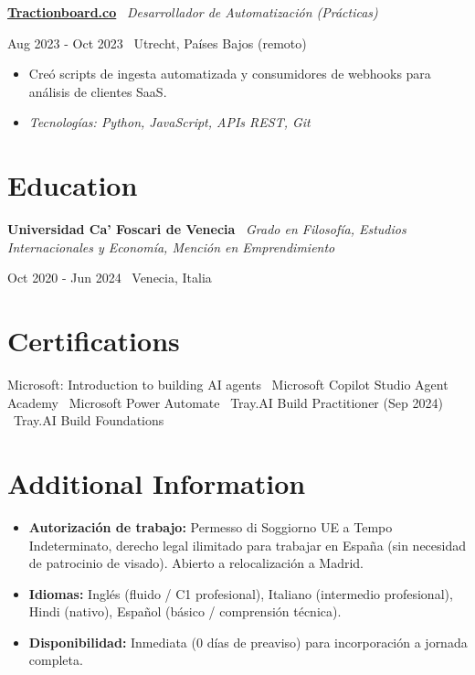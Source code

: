 \documentclass[a4paper,10pt]{article}
\newcommand{\role}[4]{%
  \vspace{2pt}\noindent
  \begin{minipage}[t]{0.70\textwidth}\raggedright\textbf{#1} \textbullet\ \textit{#3}\end{minipage}%
  \hfill
  \begin{minipage}[t]{0.28\textwidth}\raggedleft\footnotesize\color{gray}#2 \textbullet\ #4\end{minipage}%
  \vspace{1pt}%
}
\begin{document}
\role{\href{https://tractionboard.co}{Tractionboard.co}}{Aug 2023 - Oct 2023}{Desarrollador de Automatización (Prácticas)}{Utrecht, Países Bajos (remoto)}
\begin{itemize}
  \item Creó scripts de ingesta automatizada y consumidores de webhooks para análisis de clientes SaaS.
  \item \textit{Tecnologías: Python, JavaScript, APIs REST, Git}
\end{itemize}

\section{Education}
\role{Universidad Ca' Foscari de Venecia}{Oct 2020 - Jun 2024}{Grado en Filosofía, Estudios Internacionales y Economía, Mención en Emprendimiento}{Venecia, Italia}

\section{Certifications}
Microsoft: Introduction to building AI agents \textbullet\ Microsoft Copilot Studio Agent Academy \textbullet\ Microsoft Power Automate \textbullet\ Tray.AI Build Practitioner (Sep 2024) \textbullet\ Tray.AI Build Foundations

\section{Additional Information}
\begin{itemize}
  \item \textbf{Autorización de trabajo:} Permesso di Soggiorno UE a Tempo Indeterminato, derecho legal ilimitado para trabajar en España (sin necesidad de patrocinio de visado). Abierto a relocalización a Madrid.
  \item \textbf{Idiomas:} Inglés (fluido / C1 profesional), Italiano (intermedio profesional), Hindi (nativo), Español (básico / comprensión técnica).
  \item \textbf{Disponibilidad:} Inmediata (0 días de preaviso) para incorporación a jornada completa.
\end{itemize}

\end{document}
